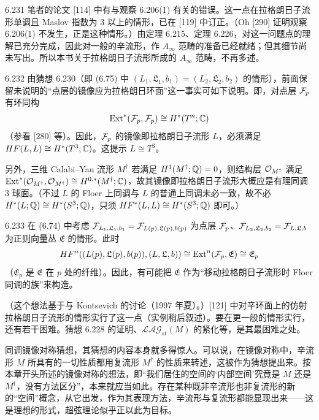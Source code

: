 \begin{remark}{6.231}
  笔者的论文 [114] 中有与观察 6.206(1) 有关的错误。这一点在拉格朗日子流形单调且 Maslov 指数为 3 以上的情形，已在 [119] 中订正。（Oh [290] 证明观察 6.206(1) 不发生，正是这种情形。）由定理 6.215、定理 6.226，对这一问题点的理解已充分完成，因此对一般的辛流形，作 $A_{\infty}$ 范畴的准备已经就绪；但其细节尚未写出。所以本书关于拉格朗日子流形所成的 $A_{\infty}$ 范畴，不再多述。
\end{remark}

\begin{remark}{6.232}
  由猜想 6.230（即 (6.75) 中 $(L_1,\mathfrak{L}_1,b_1)=(L_2,\mathfrak{L}_2,b_2)$ 的情形），前面保留未说明的“点层的镜像应为拉格朗日环面”这一事实可如下说明。即，对点层 $\mathcal{F}_p$ 有环同构
  \[
    \operatorname{Ext}^*(\mathcal{F}_p,\mathcal{F}_p)\cong H^*(T^n;\mathbb{C})
  \]
  （参看 [280] 等）。因此，$\mathcal{F}_p$ 的镜像即拉格朗日子流形 $L$，必须满足 $HF(L,L)\cong H^*(T^3;\mathbb{C})$。这提示 $L\cong T^3$。

  另外，三维 Calabi–Yau 流形 $M^\dagger$ 若满足 $H^1(M^\dagger;\mathbb{Q})=0$，则结构层 $\mathcal{O}_{M^\dagger}$ 满足 $\operatorname{Ext}^*(\mathcal{O}_{M^\dagger},\mathcal{O}_{M^\dagger})\cong H^{0,*}(M^\dagger;\mathbb{C})$，故其镜像即拉格朗日子流形大概应是有理同调 3 球面。（不过 $L$ 的 Floer 上同调与 $L$ 的普通上同调未必一致，故不必 $H^*(L;\mathbb{Q})\cong H^*(S^3;\mathbb{Q})$，只须 $HF^*(L,L)\cong H^*(S^3;\mathbb{Q})$ 即可。）
\end{remark}

\begin{remark}{6.233}
  在 (6.74) 中考虑 $\mathcal{F}_{L_1,\mathfrak{L}_1,b_1}=\mathcal{F}_{L(p),\mathfrak{L}(p),b(p)}$ 为点层 $\mathcal{F}_p$、$\mathcal{F}_{L_2,\mathfrak{L}_2,b_2}=\mathcal{F}_{L,\mathfrak{L},b}$ 为正则向量丛 $\mathfrak{E}$ 的情形。此时
  \[
    HF^n((L(p),\mathfrak{L}(p),b(p)),(L,\mathfrak{L},b))\cong\operatorname{Ext}^n(\mathcal{F}_p,\mathfrak{E})\cong\mathfrak{E}_p
  \]
  （$\mathfrak{E}_p$ 是 $\mathfrak{E}$ 在 $p$ 处的纤维）。因此，有可能把 $\mathfrak{E}$ 作为“移动拉格朗日子流形时 Floer 同调的族”来构造。
\end{remark}

（这个想法基于与 Kontsevich 的讨论（1997 年夏）。）[121] 中对辛环面上的仿射拉格朗日子流形的情形实行了这一点（实例稍后叙述）。要在更一般的情形实行，还有若干困难。猜想 6.228 的证明、$\mathcal{LAG}_{st}(M)$ 的紧化等，是其最困难之处。

同调镜像对称猜想，其猜想的内容本身就多得惊人。可以说，在镜像对称中，辛流形 $M$ 所具有的一切性质都用复流形 $M^\dagger$ 的性质来转述，这被作为猜想提出来。按本章开头所述的镜像对称的想法，即“我们居住的空间的‘内部空间’究竟是 $M$ 还是 $M^\dagger$，没有方法区分”，本来就应当如此。存在某种既非辛流形也非复流形的新的“空间”概念，从它出发，作为其表现方法，辛流形与复流形都能显现出来——这是理想的形式，超弦理论似乎正以此为目标。

